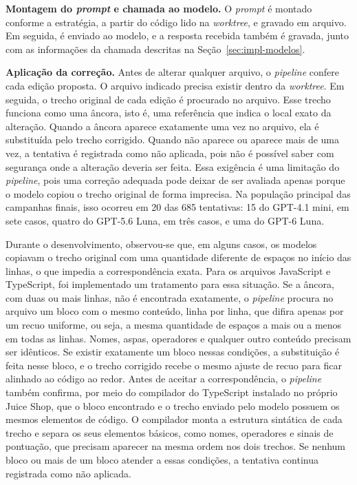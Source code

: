 \textbf{Montagem do \textit{prompt} e chamada ao modelo.} O \textit{prompt} é montado conforme a estratégia, a partir do código lido na \textit{worktree}, e gravado em arquivo. Em seguida, é enviado ao modelo, e a resposta recebida também é gravada, junto com as informações da chamada descritas na Seção~\ref{sec:impl-modelos}.

\textbf{Aplicação da correção.} Antes de alterar qualquer arquivo, o \textit{pipeline} confere cada edição proposta. O arquivo indicado precisa existir dentro da \textit{worktree}. Em seguida, o trecho original de cada edição é procurado no arquivo. Esse trecho funciona como uma âncora, isto é, uma referência que indica o local exato da alteração. Quando a âncora aparece exatamente uma vez no arquivo, ela é substituída pelo trecho corrigido. Quando não aparece ou aparece mais de uma vez, a tentativa é registrada como não aplicada, pois não é possível saber com segurança onde a alteração deveria ser feita. Essa exigência é uma limitação do \textit{pipeline}, pois uma correção adequada pode deixar de ser avaliada apenas porque o modelo copiou o trecho original de forma imprecisa. Na população principal das campanhas finais, isso ocorreu em 20 das 685 tentativas: 15 do GPT-4.1 mini, em sete casos, quatro do GPT-5.6 Luna, em três casos, e uma do GPT-6 Luna.

Durante o desenvolvimento, observou-se que, em alguns casos, os modelos copiavam o trecho original com uma quantidade diferente de espaços no início das linhas, o que impedia a correspondência exata. Para os arquivos JavaScript e TypeScript, foi implementado um tratamento para essa situação. Se a âncora, com duas ou mais linhas, não é encontrada exatamente, o \textit{pipeline} procura no arquivo um bloco com o mesmo conteúdo, linha por linha, que difira apenas por um recuo uniforme, ou seja, a mesma quantidade de espaços a mais ou a menos em todas as linhas. Nomes, aspas, operadores e qualquer outro conteúdo precisam ser idênticos. Se existir exatamente um bloco nessas condições, a substituição é feita nesse bloco, e o trecho corrigido recebe o mesmo ajuste de recuo para ficar alinhado ao código ao redor. Antes de aceitar a correspondência, o \textit{pipeline} também confirma, por meio do compilador do TypeScript instalado no próprio Juice Shop, que o bloco encontrado e o trecho enviado pelo modelo possuem os mesmos elementos de código. O compilador monta a estrutura sintática de cada trecho e separa os seus elementos básicos, como nomes, operadores e sinais de pontuação, que precisam aparecer na mesma ordem nos dois trechos. Se nenhum bloco ou mais de um bloco atender a essas condições, a tentativa continua registrada como não aplicada.

